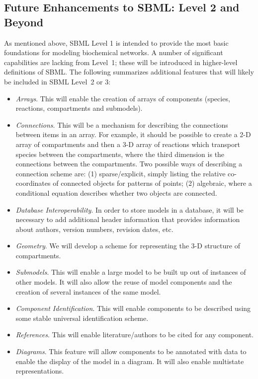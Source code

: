 \documentclass[10pt]{cekarticle}
\newcommand{\changed}[1]{\textcolor{BrickRed}{#1}}
\begin{document}
\subsection{Future Enhancements to SBML: Level 2 and Beyond}
\label{sec:level-2}

As mentioned above, SBML Level 1 is intended to provide the most basic
foundations for modeling biochemical networks.  A number of significant
capabilities are lacking from Level~1; these will be introduced in
higher-level definitions of SBML.  The following summarizes additional
features that will likely be included in SBML Level~2 \changed{or 3}:
\begin{itemize}  
  
\item \emph{Arrays}.  This will enable the creation of arrays of components
  (species, reactions, compartments and submodels).
   
\item \emph{Connections}.  This will be a mechanism for describing the
  connections between items in an array.  For example, it should be
  possible to create a 2-D array of compartments and then a 3-D array of
  reactions which transport species between the compartments, where the
  third dimension is the connections between the compartments.  Two
  possible ways of describing a connection scheme are: (1) sparse/explicit,
  simply listing the relative co-coordinates of connected objects for
  patterns of points; (2) algebraic, where a conditional equation describes
  whether two objects are connected.
  
\item \emph{Database Interoperability}.  In order to store models in a
  database, it will be necessary to add additional header information that
  provides information about authors, version numbers, revision dates, etc.

\item \emph{Geometry}.  We will develop a scheme for representing the 3-D
  structure of compartments.
  
\item \emph{Submodels}.  This will enable a large model to be built up out
  of instances of other models.  It will also allow the reuse of model
  components and the creation of several instances of the same model.
  
\item \emph{Component Identification}.  This will enable components to be
  described using some stable universal identification scheme.
  
\item \emph{References}.  This will enable literature/authors to be cited
  for any component.
  
\item \emph{Diagrams}.  This feature will allow components to be annotated
  with data to enable the display of the model in a diagram.  It will also
  enable multistate representations.

\end{itemize}
\end{document}
